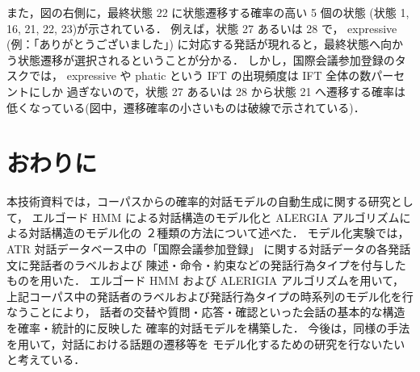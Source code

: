 また，図の右側に，最終状態 22 に状態遷移する確率の高い 5 個の状態
(状態 1, 16, 21, 22, 23)が示されている．
例えば，状態 27 あるいは 28 で，
expressive (例：「ありがとうございました」)
に対応する発話が現れると，最終状態へ向かう状態遷移が選択されるということが分かる．
しかし，国際会議参加登録のタスクでは，
expressive や phatic という IFT の出現頻度は IFT 全体の数パーセントにしか
過ぎないので，状態 27 あるいは 28 から状態 21 へ遷移する確率は
低くなっている(図中，遷移確率の小さいものは破線で示されている)．

\vspace*{-3mm}

\section{おわりに}

\vspace*{-2mm}

本技術資料では，コーパスからの確率的対話モデルの自動生成に関する研究として，
エルゴード HMM による対話構造のモデル化と
ALERGIA アルゴリズムによる対話構造のモデル化の
２種類の方法について述べた．
モデル化実験では，ATR 対話データベース中の「国際会議参加登録」
に関する対話データの各発話文に発話者のラベルおよび
陳述・命令・約束などの発話行為タイプを付与したものを用いた．
エルゴード HMM および ALERIGIA アルゴリズムを用いて，
上記コーパス中の発話者のラベルおよび発話行為タイプの時系列のモデル化を行なうことにより，
話者の交替や質問・応答・確認といった会話の基本的な構造を確率・統計的に反映した
確率的対話モデルを構築した．
今後は，同様の手法を用いて，対話における話題の遷移等を
モデル化するための研究を行ないたいと考えている．

\vspace*{-2mm}





